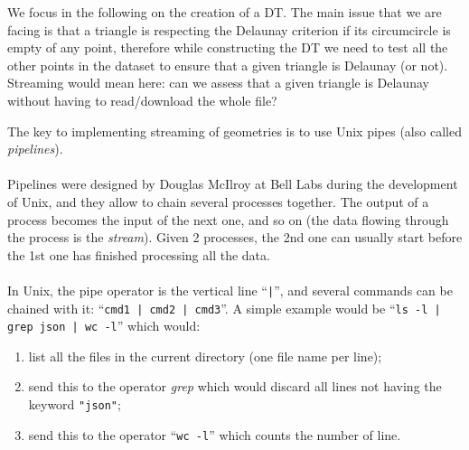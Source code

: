 %

We focus in the following on the creation of a DT\@.
The main issue that we are facing is that a triangle is respecting the Delaunay criterion if its circumcircle is empty of any point, therefore while constructing the DT we need to test all the other points in the dataset to ensure that a given triangle is Delaunay (or not).
Streaming would mean here: can we assess that a given triangle is Delaunay without having to read/download the whole file?

\begin{floatbox}
\begin{kaobox-practice}[frametitle=\faCog\ Streaming is realised with Unix pipes]
  The key to implementing streaming of geometries is to use Unix pipes (also called \emph{pipelines}).
  \\ \\
  Pipelines were designed by Douglas McIlroy at Bell Labs during the development of Unix, and they allow to chain several processes together. The output of a process becomes the input of the next one, and so on (the data flowing through the process is the \emph{stream}). Given 2 processes, the 2nd one can usually start before the 1st one has finished processing all the data.
  \\ \\
  In Unix, the pipe operator is the vertical line ``\texttt{|}'', and several commands can be chained with it: ``\texttt{cmd1 | cmd2 | cmd3}''. 
  A simple example would be ``\texttt{ls -l | grep json | wc -l}'' which would:
  \begin{enumerate}
    \item list all the files in the current directory (one file name per line); 
    \item send this to the operator \emph{grep} which would discard all lines not having the keyword \texttt{"json"}; 
    \item send this to the operator ``\texttt{wc -l}'' which counts the number of line.
   \end{enumerate} 
\end{kaobox-practice}
\end{floatbox}

